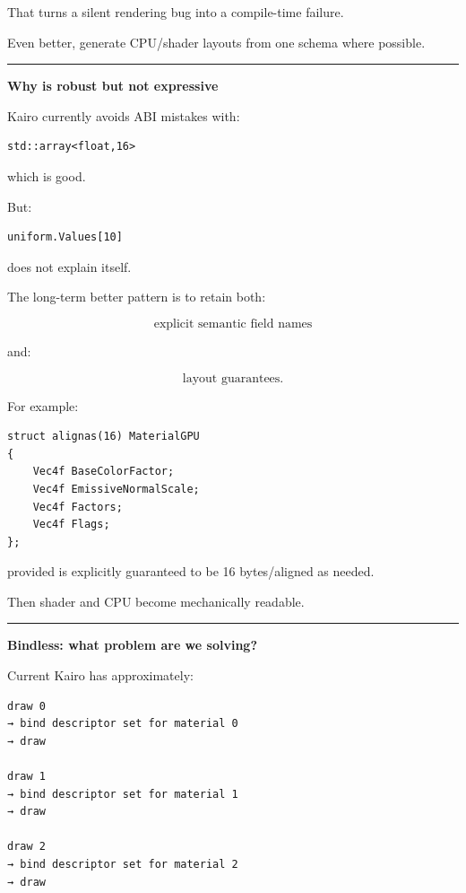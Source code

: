 That turns a silent rendering bug into a compile-time failure.

Even better, generate CPU/shader layouts from one schema where possible.

\begin{center}\rule{0.5\linewidth}{0.5pt}\end{center}

\textbf{Why  is robust but not expressive}

Kairo currently avoids ABI mistakes with:

\begin{verbatim}
std::array<float,16>
\end{verbatim}

which is good.

But:

\begin{verbatim}
uniform.Values[10]
\end{verbatim}

does not explain itself.

The long-term better pattern is to retain both:

\[
\text{explicit semantic field names}
\]

and:

\[
\text{layout guarantees}.
\]

For example:

\begin{verbatim}
struct alignas(16) MaterialGPU
{
    Vec4f BaseColorFactor;
    Vec4f EmissiveNormalScale;
    Vec4f Factors;
    Vec4f Flags;
};
\end{verbatim}

provided  is explicitly guaranteed to be 16 bytes/aligned as needed.

Then shader and CPU become mechanically readable.

\begin{center}\rule{0.5\linewidth}{0.5pt}\end{center}

\textbf{Bindless: what problem are we solving?}

Current Kairo has approximately:

\begin{verbatim}
draw 0
→ bind descriptor set for material 0
→ draw

draw 1
→ bind descriptor set for material 1
→ draw

draw 2
→ bind descriptor set for material 2
→ draw
\end{verbatim}

